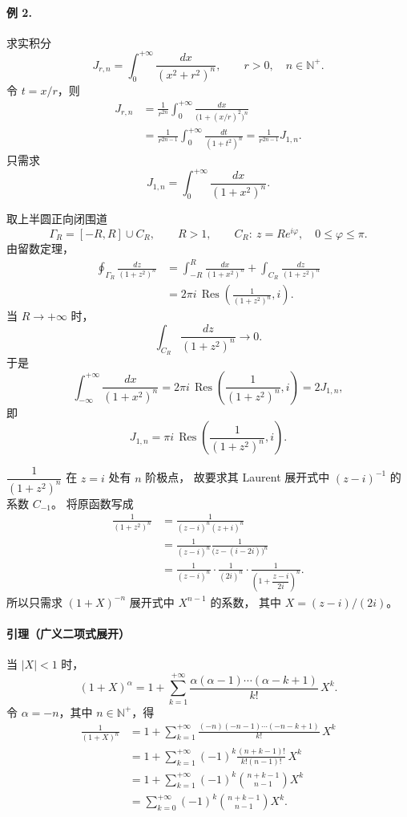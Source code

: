 \paragraph{例 2.}
求实积分
\[
  J_{r,n}=\int_0^{+\infty}\frac{dx}{(x^2+r^2)^n},
  \qquad r>0,\quad n\in\mathbb N^{+}.
\]
令 $t=x/r$，则
\begin{align*}
  J_{r,n}
  &=\frac{1}{r^{2n}}
    \int_0^{+\infty}\frac{dx}{\bigl(1+(x/r)^2\bigr)^n}\\
  &=\frac{1}{r^{2n-1}}
    \int_0^{+\infty}\frac{dt}{(1+t^2)^n}
   =\frac{1}{r^{2n-1}}J_{1,n}.
\end{align*}
只需求
\[
  J_{1,n}=\int_0^{+\infty}\frac{dx}{(1+x^2)^n}.
\]

取上半圆正向闭围道
\[
  \Gamma_R=[-R,R]\cup C_R,\qquad R>1,\qquad
  C_R:\ z=Re^{i\varphi},\quad 0\le\varphi\le\pi.
\]
由留数定理，
\begin{align*}
  \oint_{\Gamma_R}\frac{dz}{(1+z^2)^n}
  &=\int_{-R}^{R}\frac{dx}{(1+x^2)^n}
    +\int_{C_R}\frac{dz}{(1+z^2)^n}\\
  &=2\pi i\,\operatorname{Res}
    \left(\frac{1}{(1+z^2)^n},i\right).
\end{align*}
当 $R\to+\infty$ 时，
\[
  \int_{C_R}\frac{dz}{(1+z^2)^n}\longrightarrow0.
\]
于是
\[
  \int_{-\infty}^{+\infty}\frac{dx}{(1+x^2)^n}
  =2\pi i\,\operatorname{Res}
   \left(\frac{1}{(1+z^2)^n},i\right)
  =2J_{1,n},
\]
即
\[
  J_{1,n}=\pi i\,\operatorname{Res}
  \left(\frac{1}{(1+z^2)^n},i\right).
\]

$\dfrac{1}{(1+z^2)^n}$ 在 $z=i$ 处有 $n$ 阶极点，
故要求其 Laurent 展开式中 $(z-i)^{-1}$ 的系数 $C_{-1}$。
将原函数写成
\begin{align*}
  \frac{1}{(1+z^2)^n}
  &=\frac{1}{(z-i)^n(z+i)^n}\\
  &=\frac{1}{(z-i)^n}
    \frac{1}{\bigl(z-(i-2i)\bigr)^n}\\
  &=\frac{1}{(z-i)^n}\cdot\frac{1}{(2i)^n}
    \cdot\frac{1}{\left(1+\dfrac{z-i}{2i}\right)^n}.
\end{align*}
所以只需求 $(1+X)^{-n}$ 展开式中 $X^{n-1}$ 的系数，
其中 $X=(z-i)/(2i)$。

\paragraph{引理（广义二项式展开）}
当 $|X|<1$ 时，
\[
  (1+X)^\alpha
  =1+\sum_{k=1}^{+\infty}
    \frac{\alpha(\alpha-1)\cdots(\alpha-k+1)}{k!}\,X^k.
\]
令 $\alpha=-n$，其中 $n\in\mathbb N^{+}$，得
\begin{align*}
  \frac{1}{(1+X)^n}
  &=1+\sum_{k=1}^{+\infty}
    \frac{(-n)(-n-1)\cdots(-n-k+1)}{k!}\,X^k\\
  &=1+\sum_{k=1}^{+\infty}
    (-1)^k\frac{(n+k-1)!}{k!(n-1)!}\,X^k\\
  &=1+\sum_{k=1}^{+\infty}
    (-1)^k\binom{n+k-1}{n-1}X^k\\
  &=\sum_{k=0}^{+\infty}
    (-1)^k\binom{n+k-1}{n-1}X^k.
\end{align*}

